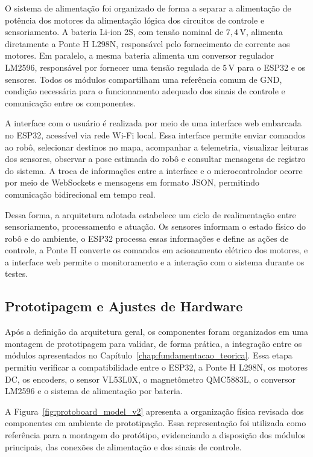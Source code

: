 \documentclass[	12pt, Times, openright, twoside, a4paper, english, brazil]{abntex2}
\begin{document}
O sistema de alimentação foi organizado de forma a separar a alimentação de potência dos motores da alimentação lógica dos circuitos de controle e sensoriamento. A bateria Li-ion 2S, com tensão nominal de $7{,}4\,\text{V}$, alimenta diretamente a Ponte H L298N, responsável pelo fornecimento de corrente aos motores. Em paralelo, a mesma bateria alimenta um conversor regulador LM2596, responsável por fornecer uma tensão regulada de $5\,\text{V}$ para o ESP32 e os sensores. Todos os módulos compartilham uma referência comum de GND, condição necessária para o funcionamento adequado dos sinais de controle e comunicação entre os componentes.

A interface com o usuário é realizada por meio de uma interface web embarcada no ESP32, acessível via rede Wi-Fi local. Essa interface permite enviar comandos ao robô, selecionar destinos no mapa, acompanhar a telemetria, visualizar leituras dos sensores, observar a pose estimada do robô e consultar mensagens de registro do sistema. A troca de informações entre a interface e o microcontrolador ocorre por meio de WebSockets e mensagens em formato JSON, permitindo comunicação bidirecional em tempo real.

Dessa forma, a arquitetura adotada estabelece um ciclo de realimentação entre sensoriamento, processamento e atuação. Os sensores informam o estado físico do robô e do ambiente, o ESP32 processa essas informações e define as ações de controle, a Ponte H converte os comandos em acionamento elétrico dos motores, e a interface web permite o monitoramento e a interação com o sistema durante os testes.

\subsection{Prototipagem e Ajustes de Hardware}
\label{sec:prototipagem_ajustes}

Após a definição da arquitetura geral, os componentes foram organizados em uma montagem de prototipagem para validar, de forma prática, a integração entre os módulos apresentados no Capítulo~\ref{chap:fundamentacao_teorica}. Essa etapa permitiu verificar a compatibilidade entre o ESP32, a Ponte H L298N, os motores DC, os encoders, o sensor VL53L0X, o magnetômetro QMC5883L, o conversor LM2596 e o sistema de alimentação por bateria.

A Figura~\ref{fig:protoboard_model_v2} apresenta a organização física revisada dos componentes em ambiente de prototipação. Essa representação foi utilizada como referência para a montagem do protótipo, evidenciando a disposição dos módulos principais, das conexões de alimentação e dos sinais de controle.
\end{document}
